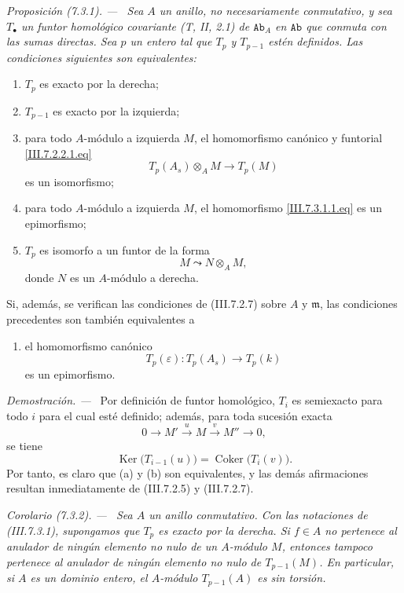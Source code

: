 \documentclass[10pt,oneside]{book}
\newcommand{\cat}[1]{\mathtt{#1}}
\newcommand{\Ker}{\operatorname{Ker}}
\newcommand{\Coker}{\operatorname{Coker}}
\newcommand{\sref}[2][]{\textup{(#2)}}
\newcommand{\oldpage}[2][]{\setcounter{footnote}{0}\marginpar{\scriptsize\textbf{#1}~|~#2}\ignorespaces}
\newenvironment{proposition}[1][]{\par\medskip\noindent\itshape Proposición (#1). ---\ }{\par}
\newenvironment{corollary}[1][]{\par\medskip\noindent\itshape Corolario (#1). ---\ }{\par}
\newenvironment{proof}{\par\medskip\noindent\textit{Demostración. ---\ }}{\par}
\begin{document}
\begin{proposition}[7.3.1]
\label{III.7.3.1}
Sea $A$ un anillo, no necesariamente conmutativo, y sea
$T_\bullet$ un funtor homológico covariante
\emph{(T, II, 2.1)} de $\cat{Ab}_A$ en $\cat{Ab}$ que
conmuta con las sumas directas. Sea $p$ un entero tal que
$T_p$ y $T_{p-1}$ estén definidos. Las condiciones siguientes son
equivalentes:
\begin{enumerate}
  \item[(a)] $T_p$ es exacto por la derecha;
  \item[(b)] $T_{p-1}$ es exacto por la izquierda;

\oldpage[III]{181}

  \item[(c)] para todo $A$-módulo a izquierda $M$, el homomorfismo
    canónico y funtorial \eqref{III.7.2.2.1.eq}
    \[
      T_p(A_s)\otimes_A M
      \longrightarrow
      T_p(M)
      \tag{7.3.1.1}\label{III.7.3.1.1.eq}
    \]
    es un isomorfismo;
  \item[(d)] para todo $A$-módulo a izquierda $M$, el homomorfismo
    \eqref{III.7.3.1.1.eq} es un epimorfismo;
  \item[(e)] $T_p$ es isomorfo a un funtor de la forma
    \[
      M\leadsto N\otimes_A M,
    \]
    donde $N$ es un $A$-módulo a derecha.
\end{enumerate}
Si, además, se verifican las condiciones de \sref{III.7.2.7} sobre
$A$ y $\mathfrak m$, las condiciones precedentes son también
equivalentes a
\begin{enumerate}
  \item[(f)] el homomorfismo canónico
    \[
      T_p(\varepsilon):T_p(A_s)\longrightarrow T_p(k)
    \]
    es un epimorfismo.
\end{enumerate}
\end{proposition}

\begin{proof}
Por definición de funtor homológico, $T_i$ es semiexacto para todo
$i$ para el cual esté definido; además, para toda sucesión exacta
\[
  0\longrightarrow M'
  \xrightarrow{u}M
  \xrightarrow{v}M''
  \longrightarrow0,
\]
se tiene
\[
  \Ker\bigl(T_{i-1}(u)\bigr)
  =
  \Coker\bigl(T_i(v)\bigr).
\]
Por tanto, es claro que (a) y (b) son equivalentes, y las demás
afirmaciones resultan inmediatamente de \sref{III.7.2.5} y
\sref{III.7.2.7}.
\end{proof}

\begin{corollary}[7.3.2]
\label{III.7.3.2}
Sea $A$ un anillo conmutativo. Con las notaciones de
\sref{III.7.3.1}, supongamos que $T_p$ es exacto por la derecha. Si
$f\in A$ no pertenece al anulador de ningún elemento no nulo de un
$A$-módulo $M$, entonces tampoco pertenece al anulador de ningún
elemento no nulo de $T_{p-1}(M)$. En particular, si $A$ es un
dominio entero, el $A$-módulo $T_{p-1}(A)$ es sin torsión.
\end{corollary}
\end{document}
